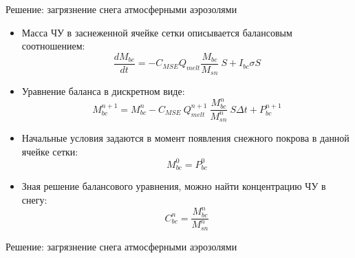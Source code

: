 \documentclass[unicode]{beamer}
\begin{document}
\begin{frame}{Решение: загрязнение снега атмосферными аэрозолями}

\footnotesize
\begin{itemize}
    \item Масса ЧУ в заснеженной ячейке сетки описывается балансовым соотношением:
    \[ \dfrac{d M_{bc}}{d t} = - C_{MSE} Q_{melt} \dfrac{M_{bc}}{M_{sn}} ~ S + I_{bc} \sigma S \]
    \item Уравнение баланса в дискретном виде:
    \[ M_{bc}^{n+1} = M_{bc}^n - C_{MSE} ~ Q_{melt}^{n+1} ~ \dfrac{M_{bc}^n}{M_{sn}^n} ~ S \Delta t + P_{bc}^{n+1} \]
    \item Начальные условия задаются в момент появления снежного покрова в данной ячейке сетки:
    \[ M_{bc}^0 = P_{bc}^0 \]
    \item Зная решение балансового уравнения, можно найти концентрацию ЧУ в снегу:
    \[ C_{bc}^n = \dfrac{M_{bc}^n}{M_{sn}^n} \]
\end{itemize}

\end{frame}



\begin{frame}{Решение: загрязнение снега атмосферными аэрозолями}

\tiny
\begin{figure}[h]
    \begin{minipage}[h]{0.85\linewidth}
    \end{minipage}
    
    \begin{minipage}[h]{1\linewidth}
        \\
        ~\\
        \\
    \end{minipage}
\end{figure}

\end{frame}
\end{document}
